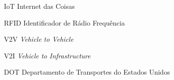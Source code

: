 \begin{siglas}
  \item[IoT] Internet das Coisas
  \item[RFID] Identificador de Rádio Frequência
  \item[V2V] \textit{Vehicle to Vehicle}
  \item[V2I] \textit{Vehicle to Infrastructure}
  \item[DOT] Departamento de Transportes do Estados Unidos
\end{siglas}